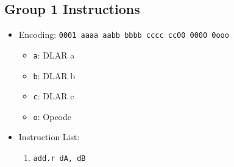 \documentclass{article}
\begin{document}
	\subsection{Group 1 Instructions}
		\begin{itemize}
		\item Encoding: \texttt{0001 aaaa aabb bbbb  cccc cc00 0000 0ooo}
			\begin{itemize}
			\item \texttt{a}: DLAR a
			\item \texttt{b}: DLAR b
			\item \texttt{c}: DLAR c
			\item \texttt{o}: Opcode
			\end{itemize}
		\item Instruction List:
			\begin{enumerate}
			\item \texttt{add.r dA, dB}
				\begin{itemize}

\end{itemize}
\end{enumerate}
\end{itemize}
\end{document}
